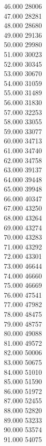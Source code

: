 { 46.000	28006 \\
 47.000	28281 \\
 48.000	28680 \\
 49.000	29136 \\
 50.000	29980 \\
 51.000	30023 \\
 52.000	30345 \\
 53.000	30670 \\
 54.000	31059 \\
 55.000	31489 \\
 56.000	31830 \\
 57.000	32253 \\
 58.000	33055 \\
 59.000	33077 \\
 60.000	34713 \\
 61.000	34740 \\
 62.000	34758 \\
 63.000	39137 \\
 64.000	39448 \\
 65.000	39948 \\
 66.000	40347 \\
 67.000	43250 \\
 68.000	43264 \\
 69.000	43274 \\
 70.000	43283 \\
 71.000	43292 \\
 72.000	43301 \\
 73.000	46644 \\
 74.000	46660 \\
 75.000	46669 \\
 76.000	47541 \\
 77.000	47982 \\
 78.000	48475 \\
 79.000	48757 \\
 80.000	49088 \\
 81.000	49572 \\
 82.000	50006 \\
 83.000	50675 \\
 84.000	51010 \\
 85.000	51590 \\
 86.000	51972 \\
 87.000	52455 \\
 88.000	52820 \\
 89.000	53233 \\
 90.000	53574 \\
 91.000	54075 \\
}
